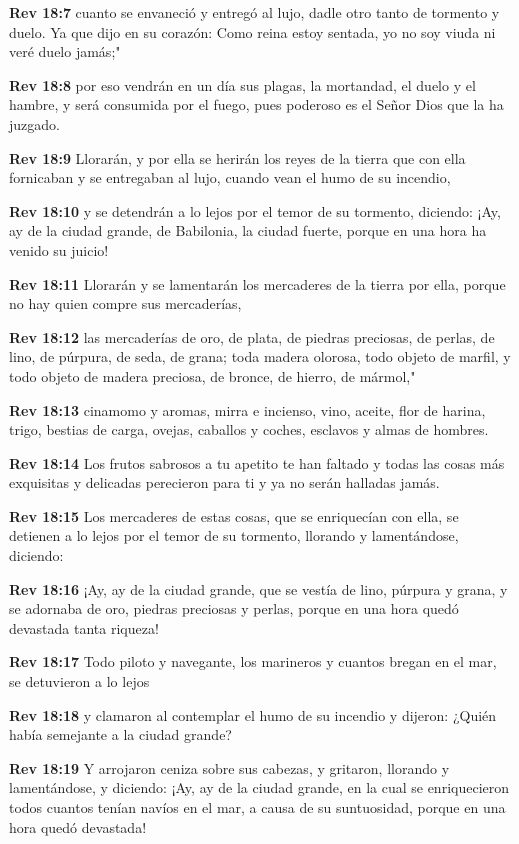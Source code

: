 \textbf{Rev 18:7} cuanto se envaneció y entregó al lujo, dadle otro tanto de tormento y duelo. Ya que dijo en su corazón: Como reina estoy sentada, yo no soy viuda ni veré duelo jamás;" 

\textbf{Rev 18:8} por eso vendrán en un día sus plagas, la mortandad, el duelo y el hambre, y será consumida por el fuego, pues poderoso es el Señor Dios que la ha juzgado. 

\textbf{Rev 18:9} Llorarán, y por ella se herirán los reyes de la tierra que con ella fornicaban y se entregaban al lujo, cuando vean el humo de su incendio, 

\textbf{Rev 18:10} y se detendrán a lo lejos por el temor de su tormento, diciendo: ¡Ay, ay de la ciudad grande, de Babilonia, la ciudad fuerte, porque en una hora ha venido su juicio! 

\textbf{Rev 18:11} Llorarán y se lamentarán los mercaderes de la tierra por ella, porque no hay quien compre sus mercaderías, 

\textbf{Rev 18:12} las mercaderías de oro, de plata, de piedras preciosas, de perlas, de lino, de púrpura, de seda, de grana; toda madera olorosa, todo objeto de marfil, y todo objeto de madera preciosa, de bronce, de hierro, de mármol," 

\textbf{Rev 18:13} cinamomo y aromas, mirra e incienso, vino, aceite, flor de harina, trigo, bestias de carga, ovejas, caballos y coches, esclavos y almas de hombres. 

\textbf{Rev 18:14} Los frutos sabrosos a tu apetito te han faltado y todas las cosas más exquisitas y delicadas perecieron para ti y ya no serán halladas jamás. 

\textbf{Rev 18:15} Los mercaderes de estas cosas, que se enriquecían con ella, se detienen a lo lejos por el temor de su tormento, llorando y lamentándose, diciendo: 

\textbf{Rev 18:16} ¡Ay, ay de la ciudad grande, que se vestía de lino, púrpura y grana, y se adornaba de oro, piedras preciosas y perlas, porque en una hora quedó devastada tanta riqueza! 

\textbf{Rev 18:17} Todo piloto y navegante, los marineros y cuantos bregan en el mar, se detuvieron a lo lejos 

\textbf{Rev 18:18} y clamaron al contemplar el humo de su incendio y dijeron: ¿Quién había semejante a la ciudad grande? 

\textbf{Rev 18:19} Y arrojaron ceniza sobre sus cabezas, y gritaron, llorando y lamentándose, y diciendo: ¡Ay, ay de la ciudad grande, en la cual se enriquecieron todos cuantos tenían navíos en el mar, a causa de su suntuosidad, porque en una hora quedó devastada! 

